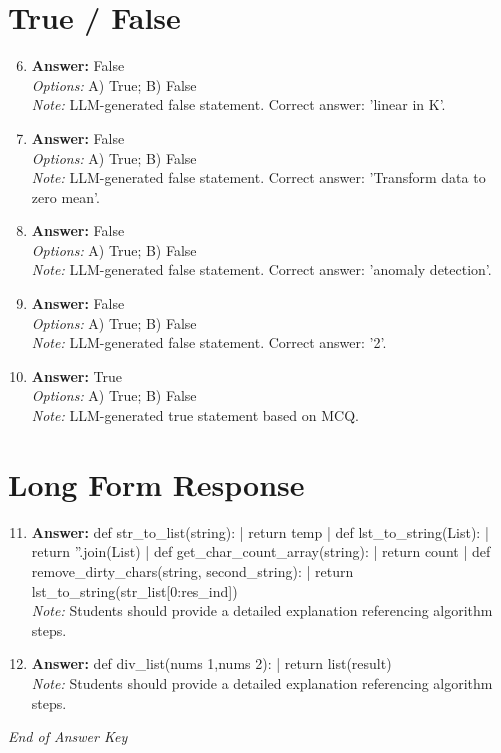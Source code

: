 \documentclass[12pt]{article}
\begin{document}
\section*{True / False}
\begin{enumerate}[label=\arabic*.]
\setcounter{enumi}{5}
\item \textbf{Answer:} False
\\ \textit{Options:} A) True; B) False
\\ \textit{Note:} LLM-generated false statement. Correct answer: 'linear in K'.
\item \textbf{Answer:} False
\\ \textit{Options:} A) True; B) False
\\ \textit{Note:} LLM-generated false statement. Correct answer: 'Transform data to zero mean'.
\item \textbf{Answer:} False
\\ \textit{Options:} A) True; B) False
\\ \textit{Note:} LLM-generated false statement. Correct answer: 'anomaly detection'.
\item \textbf{Answer:} False
\\ \textit{Options:} A) True; B) False
\\ \textit{Note:} LLM-generated false statement. Correct answer: '2'.
\item \textbf{Answer:} True
\\ \textit{Options:} A) True; B) False
\\ \textit{Note:} LLM-generated true statement based on MCQ.
\end{enumerate}

\section*{Long Form Response}
\begin{enumerate}[label=\arabic*.]
\setcounter{enumi}{10}
\item \textbf{Answer:} def str\_to\_list(string): | return temp | def lst\_to\_string(List): | return ''.join(List) | def get\_char\_count\_array(string): | return count | def remove\_dirty\_chars(string, second\_string): | return lst\_to\_string(str\_list[0:res\_ind])
\\ \textit{Note:} Students should provide a detailed explanation referencing algorithm steps.
\item \textbf{Answer:} def div\_list(nums 1,nums 2): | return list(result)
\\ \textit{Note:} Students should provide a detailed explanation referencing algorithm steps.
\end{enumerate}

\vfill
\noindent\textit{End of Answer Key}
\end{document}
